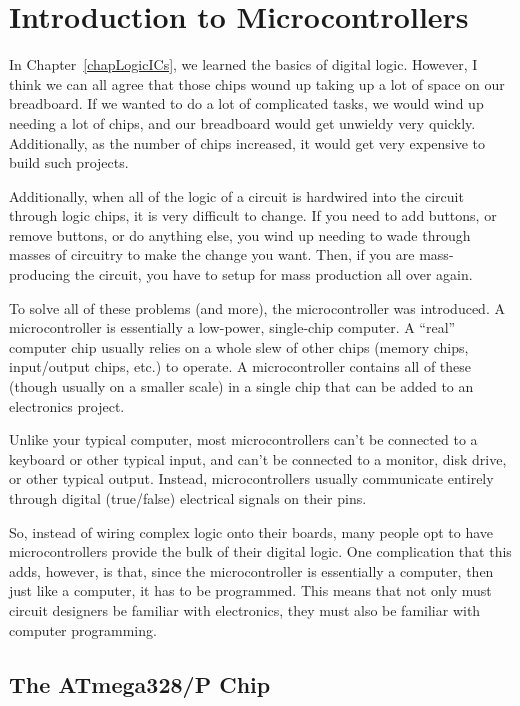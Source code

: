 \chapter{Introduction to Microcontrollers}

In Chapter~\ref{chapLogicICs}, we learned the basics of digital logic.
However, I think we can all agree that those chips wound up taking up a lot of space on our breadboard.
If we wanted to do a lot of complicated tasks, we would wind up needing a lot of chips, and our breadboard would get unwieldy very quickly.
Additionally, as the number of chips increased, it would get very expensive to build such projects.

Additionally, when all of the logic of a circuit is hardwired into the circuit through logic chips, it is very difficult to change.
If you need to add buttons, or remove buttons, or do anything else, you wind up needing to wade through masses of circuitry to make the change you want.
Then, if you are mass-producing the circuit, you have to setup for mass production all over again.

To solve all of these problems (and more), the microcontroller was introduced.
A microcontroller is essentially a low-power, single-chip computer.
A ``real'' computer chip usually relies on a whole slew of other chips (memory chips, input/output chips, etc.) to operate.
A microcontroller contains all of these (though usually on a smaller scale) in a single chip that can be added to an electronics project.

Unlike your typical computer, most microcontrollers can't be connected to a keyboard or other typical input, and can't be connected to a monitor, disk drive, or other typical output.
Instead, microcontrollers usually communicate entirely through digital (true/false) electrical signals on their pins.

So, instead of wiring complex logic onto their boards, many people opt to have microcontrollers provide the bulk of their digital logic.
One complication that this adds, however, is that, since the microcontroller is essentially a computer, then just like a computer, it has to be programmed.
This means that not only must circuit designers be familiar with electronics, they must also be familiar with computer programming.

\section{The ATmega328/P Chip}

